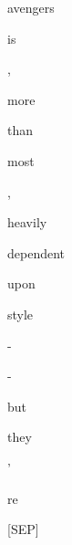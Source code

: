 \documentclass[varwidth=150mm]{standalone}
\begin{document}
\begin{CJK*}{UTF8}{gbsn}
{{{\colorbox{red!39.27312469482422}{\strut avengers} \colorbox{red!3.538182497024536}{\strut is} \colorbox{red!1.4165922403335571}{\strut ,} \colorbox{red!1.2531527280807495}{\strut more} \colorbox{red!0.0}{\strut than} \colorbox{red!1.4005296230316162}{\strut most} \colorbox{red!0.0}{\strut ,} \colorbox{red!1.9789401292800903}{\strut heavily} \colorbox{red!0.0}{\strut dependent} \colorbox{red!1.1482120752334595}{\strut upon} \colorbox{red!3.083284378051758}{\strut style} \colorbox{red!0.0}{\strut -} \colorbox{red!1.0502535104751587}{\strut -} \colorbox{red!3.7451460361480713}{\strut but} \colorbox{red!4.358949661254883}{\strut they} \colorbox{red!0.0}{\strut '} \colorbox{red!6.3047685623168945}{\strut re} \colorbox{red!1.9791393280029297}{\strut [SEP]}
}}}
\end{CJK*}
\end{document}
